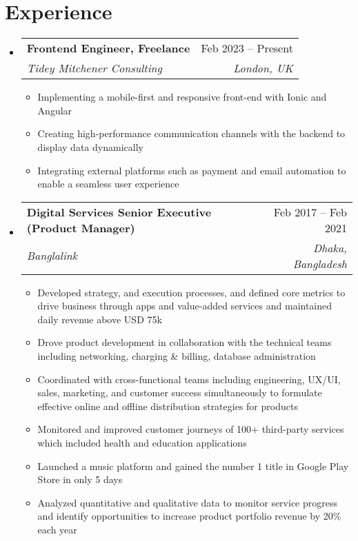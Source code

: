 \documentclass[letterpaper,11pt]{article}
\makeatletter
\newcommand{\resumeItem}[1]{
  \item\small{
    {#1 \vspace{-2pt}}
  }
}
\newcommand{\resumeSubheading}[4]{
  \vspace{-2pt}\item
    \begin{tabular*}{0.97\textwidth}[t]{l@{\extracolsep{\fill}}r}
      \textbf{#1} & #2 \\
      \textit{\small#3} & \textit{\small #4} \\
    \end{tabular*}\vspace{-7pt}
}
\newcommand{\resumeSubHeadingListStart}{\begin{itemize}[leftmargin=0.15in, label={}]}
\newcommand{\resumeSubHeadingListEnd}{\end{itemize}}
\newcommand{\resumeItemListStart}{\begin{itemize}}
\newcommand{\resumeItemListEnd}{\end{itemize}\vspace{-5pt}}
\makeatother
\begin{document}
\section{Experience}
  \resumeSubHeadingListStart

    \resumeSubheading
      {Frontend Engineer, Freelance}{Feb 2023 -- Present}
      {Tidey Mitchener Consulting}{London, UK}
      \resumeItemListStart
        \resumeItem{Implementing a mobile-first and responsive front-end with Ionic and Angular}
        \resumeItem{Creating high-performance communication channels with the backend to display data dynamically}
        \resumeItem{Integrating external platforms such as payment and email automation to enable a seamless user experience}
      \resumeItemListEnd

    \resumeSubheading
      {Digital Services Senior Executive (Product Manager)}{Feb 2017 – Feb 2021}
      {Banglalink}{Dhaka, Bangladesh}
      \resumeItemListStart
        \resumeItem{Developed strategy, and execution processes, and defined core metrics to drive business through apps and value-added services and maintained daily revenue above USD 75k}
        \resumeItem{Drove product development in collaboration with the technical teams including networking, charging \& billing, database administration}
        \resumeItem{Coordinated with cross-functional teams including engineering, UX/UI, sales, marketing, and customer success simultaneously to formulate effective online and offline distribution strategies for products}
        \resumeItem{Monitored and improved customer journeys of 100+ third-party services which included health and education applications}
        \resumeItem{Launched a music platform and gained the number 1 title in Google Play Store in only 5 days}
        \resumeItem{Analyzed quantitative and qualitative data to monitor service progress and identify opportunities to increase product portfolio revenue by 20\% each year}
    \resumeItemListEnd

  \resumeSubHeadingListEnd


\end{document}
